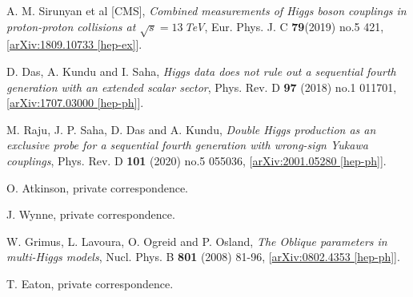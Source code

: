 \documentclass[a4paper,12pt]{article}
\begin{document}
\begin{thebibliography}{99}
A. M. Sirunyan et al [CMS], \emph{Combined measurements of Higgs boson couplings in proton-proton collisions at $\sqrt{s}=13\,$TeV}, Eur. Phys. J. C \textbf{79}(2019) no.5 421, [\href{https://arxiv.org/abs/1809.10733}{arXiv:1809.10733 [hep-ex]}].%

D. Das, A. Kundu and I. Saha, \emph{Higgs data does not rule out a sequential fourth generation with an extended scalar sector}, Phys. Rev. D \textbf{97} (2018) no.1 011701, [\href{https://arxiv.org/abs/1707.03000}{arXiv:1707.03000 [hep-ph]}].%

M. Raju, J. P. Saha, D. Das and A. Kundu, \emph{Double Higgs production as an exclusive probe for a sequential fourth generation with wrong-sign Yukawa couplings}, Phys. Rev. D \textbf{101} (2020) no.5 055036, [\href{https://arxiv.org/abs/2001.05280}{arXiv:2001.05280 [hep-ph]}].%

O. Atkinson, private correspondence.

J. Wynne, private correspondence.

W. Grimus, L. Lavoura, O. Ogreid and P. Osland, \emph{The Oblique parameters in multi-Higgs models}, Nucl. Phys. B \textbf{801} (2008) 81-96, [\href{https://arxiv.org/abs/0802.4353}{arXiv:0802.4353 [hep-ph]}].%

T. Eaton, private correspondence.

\end{thebibliography}

\appendix
\end{document}
